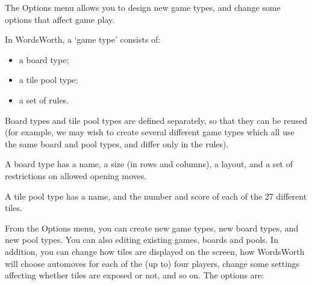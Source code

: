 The Options menu allows you to design new game types, and change some options 
that affect game play.

In WordsWorth, a `game type' consists of:

\begin{itemize}
\item a board type;
\item a tile pool type;
\item a set of rules.
\end{itemize}

Board types and tile pool types are defined separately, so that they
can be reused (for example, we may wish to create several different 
game types which all use the same board and pool types, and differ
only in the rules).

A board type has a name, a size (in rows and columns),
a layout, and a set of restrictions on allowed opening
moves.

A tile pool type has a name, and the number and score of each of the
27 different tiles.

From the Options menu, you can create new game types, new board types,
and new pool types. You can also editing existing games, boards and
pools. In addition, you can change how tiles are displayed on the
screen, how WordsWorth will choose automoves for each of the (up to)
four players, change some settings affecting whether tiles are
exposed or not, and so on. The options are:

